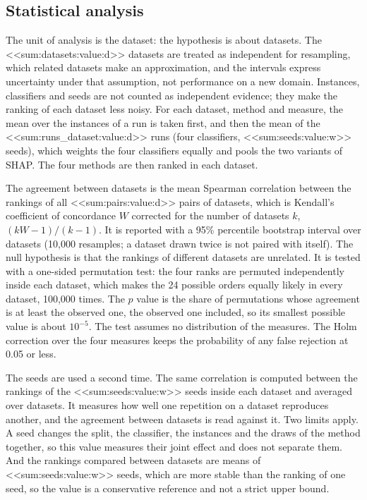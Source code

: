 \documentclass[10pt,a4paper,twocolumn]{article}
\begin{document}
\subsection{Statistical analysis}

The unit of analysis is the dataset: the hypothesis is about datasets. The
<<sum:datasets:value:d>> datasets are treated as independent for resampling, which
related datasets make an approximation, and the intervals express uncertainty under that
assumption, not performance on a new domain. Instances, classifiers and seeds are not
counted as independent evidence; they make the ranking of each dataset less noisy. For
each dataset, method and measure, the mean over the instances of a run is taken first,
and then the mean of the <<sum:runs_dataset:value:d>> runs (four classifiers,
<<sum:seeds:value:w>> seeds), which weights the four classifiers equally and pools the
two variants of SHAP. The four methods are then ranked in each dataset.

The agreement between datasets is the mean Spearman correlation between the rankings of
all <<sum:pairs:value:d>> pairs of datasets, which is Kendall's coefficient of concordance
$W$ corrected for the number of datasets $k$, $(kW-1)/(k-1)$. It is reported with a 95\%
percentile bootstrap interval over datasets (10,000 resamples; a dataset drawn twice is not paired with itself). The null hypothesis is
that the rankings of different datasets are unrelated. It is tested with a one-sided
permutation test: the four ranks are permuted independently inside each dataset, which
makes the 24 possible orders equally likely in every dataset, 100,000 times. The $p$
value is the share of permutations whose agreement is at least the observed one, the
observed one included, so its smallest possible value is about $10^{-5}$. The test
assumes no distribution of the measures. The Holm correction over the four measures
keeps the probability of any false rejection at 0.05 or less.

The seeds are used a second time. The same correlation is computed between the rankings
of the <<sum:seeds:value:w>> seeds inside each dataset and averaged over datasets. It
measures how well one repetition on a dataset reproduces another, and the agreement
between datasets is read against it. Two limits apply. A seed changes the split, the
classifier, the instances and the draws of the method together, so this value measures
their joint effect and does not separate them. And the rankings compared between datasets
are means of <<sum:seeds:value:w>> seeds, which are more stable than the ranking of one
seed, so the value is a conservative reference and not a strict upper bound.
\end{document}
